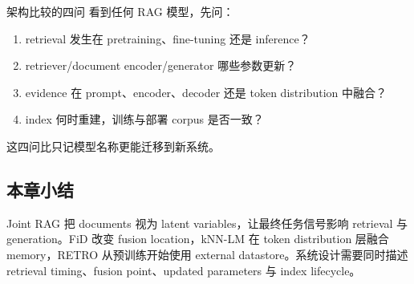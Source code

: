 
\begin{importantbox}{架构比较的四问}
看到任何 RAG 模型，先问：
\begin{enumerate}
  \item retrieval 发生在 pretraining、fine-tuning 还是 inference？
  \item retriever/document encoder/generator 哪些参数更新？
  \item evidence 在 prompt、encoder、decoder 还是 token distribution 中融合？
  \item index 何时重建，训练与部署 corpus 是否一致？
\end{enumerate}
这四问比只记模型名称更能迁移到新系统。
\end{importantbox}


\subsection{本章小结}

Joint RAG 把 documents 视为 latent variables，让最终任务信号影响 retrieval 与 generation。FiD 改变 fusion location，kNN-LM 在 token distribution 层融合 memory，RETRO 从预训练开始使用 external datastore。系统设计需要同时描述 retrieval timing、fusion point、updated parameters 与 index lifecycle。

